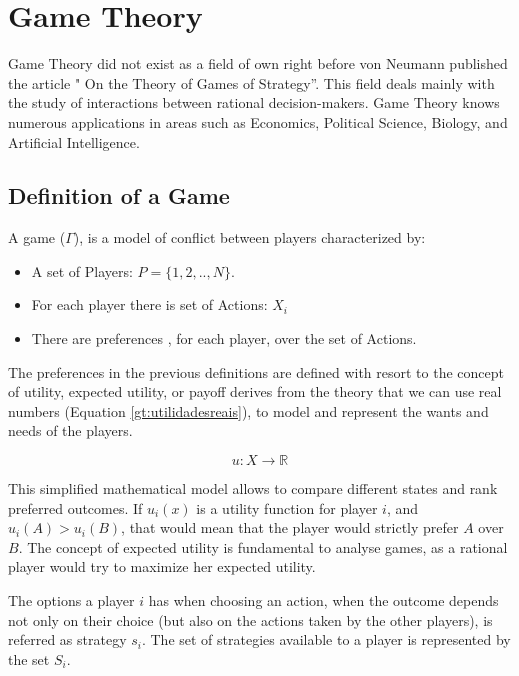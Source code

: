 \clearpage

\section{Game Theory}
\label{sec:background:game_theory}

Game Theory did not exist as a field of own right before von Neumann published the article " On the Theory of Games of Strategy''. This field deals mainly with the study of interactions between rational decision-makers\cite{Neumann1944}. Game Theory knows numerous applications in areas such as Economics, Political Science, Biology, and Artificial Intelligence. 

\subsection{Definition of a Game}
\label{subsec:background:game_theory_definition}

A game ($\Gamma$), is a model of conflict between players characterized by\cite{Osborne2004}\cite{OsbRub94}\cite{Fra2011}:
\begin{itemize}
\item A set of Players: $P=\{1, 2, .., N \}$.
\item For each player there is set of Actions: $X_{i}$
\item There are preferences , for each player, over the set of Actions.
\end{itemize}


The preferences in the previous definitions are defined with resort to the concept of utility, expected utility, or payoff derives from the theory that we can use real numbers (Equation \ref{gt:utilidadesreais}), to model and represent the wants and needs of the players. 

\begin{equation}
u:X\rightarrow\mathbb{R}
\label{gt:utilidadesreais}
\end{equation}

This simplified mathematical model allows to compare different states and rank preferred outcomes. If $u_{i}(x)$ is a utility function for player $i$, and $u_{i}(A)>u_{i}(B)$, that would mean that the player would strictly prefer $A$ over $B$. The concept of expected utility is fundamental to analyse games, as a rational player would try to maximize her expected utility\cite{Neumann1944}\cite{Osborne2004}\cite{Leyton-Brown2008:Essentials_Game_Theory}.


The options a player $i$ has when choosing an action, when the outcome depends not only on their choice (but also on the actions taken by the other players), is referred as strategy $s_{i}$. The set of strategies available to a player is represented by the set $S_{i}$.

